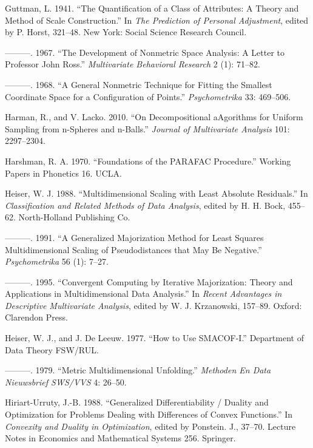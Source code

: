 \documentclass[
  12pt,
  letterpaper,
  DIV=11,
  numbers=noendperiod]{scrreprt}
\newlength{\cslhangindent}
\newenvironment{CSLReferences}[2] %
 {\begin{list}{}{%
  \setlength{\itemindent}{0pt}
  \setlength{\leftmargin}{0pt}
  \setlength{\parsep}{0pt}
  \ifodd #1
   \setlength{\leftmargin}{\cslhangindent}
   \setlength{\itemindent}{-1\cslhangindent}
  \fi
  \setlength{\itemsep}{#2\baselineskip}}}
 {\end{list}}
\theoremstyle{remark}
\begin{document}
\begin{CSLReferences}{1}{0}
Guttman, L. 1941. {``{The Quantification of a Class of Attributes: A
Theory and Method of Scale Construction}.''} In \emph{The Prediction of
Personal Adjustment}, edited by P. Horst, 321--48. New York: Social
Science Research Council.

---------. 1967. {``{The Development of Nonmetric Space Analysis: A
Letter to Professor John Ross}.''} \emph{Multivariate Behavioral
Research} 2 (1): 71--82.

---------. 1968. {``{A General Nonmetric Technique for Fitting the
Smallest Coordinate Space for a Configuration of Points}.''}
\emph{Psychometrika} 33: 469--506.

Harman, R., and V. Lacko. 2010. {``{On Decompositional aAgorithms for
Uniform Sampling from n-Spheres and n-Balls}.''} \emph{Journal of
Multivariate Analysis} 101: 2297--2304.

Harshman, R. A. 1970. {``{Foundations of the PARAFAC Procedure}.''}
Working Papers in Phonetics 16. UCLA.

Heiser, W. J. 1988. {``{Multidimensional Scaling with Least Absolute
Residuals}.''} In \emph{Classification and Related Methods of Data
Analysis}, edited by H. H. Bock, 455--62. North-Holland Publishing Co.

---------. 1991. {``{A Generalized Majorization Method for Least Squares
Multidimensional Scaling of Pseudodistances that May Be Negative}.''}
\emph{Psychometrika} 56 (1): 7--27.

---------. 1995. {``{Convergent Computing by Iterative Majorization:
Theory and Applications in Multidimensional Data Analysis}.''} In
\emph{Recent Advantages in Descriptive Multivariate Analysis}, edited by
W. J. Krzanowski, 157--89. Oxford: Clarendon Press.

Heiser, W. J., and J. De Leeuw. 1977. {``How to Use {SMACOF-I}.''}
Department of Data Theory FSW/RUL.

---------. 1979. {``Metric Multidimensional Unfolding.''} \emph{Methoden
En Data Nieuwsbrief SWS/VVS} 4: 26--50.

Hiriart-Urruty, J.-B. 1988. {``Generalized Differentiability / Duality
and Optimization for Problems Dealing with Differences of Convex
Functions.''} In \emph{Convexity and Duality in Optimization}, edited by
Ponstein. J., 37--70. Lecture Notes in Economics and Mathematical
Systems 256. Springer.


\end{CSLReferences}
\end{document}

